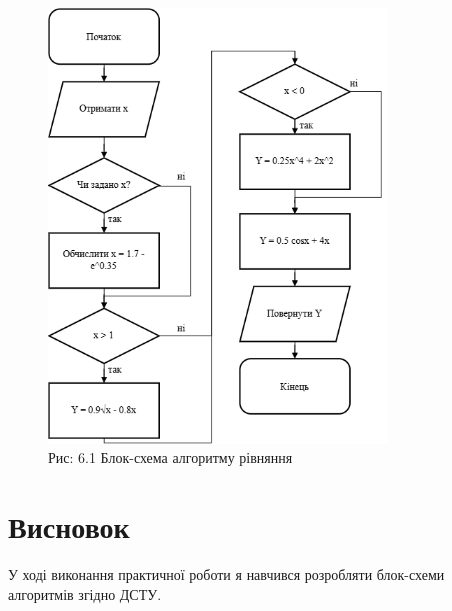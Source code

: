 \documentclass[a4paper]{article}
\begin{document}
\begin{figure}[h]
    \centering
    \includegraphics[width=0.8\textwidth]{imgs/PW6.png}
    \caption*{Рис: 6.1 Блок-схема алгоритму рівняння}
\end{figure}

\section*{Висновок}
У ході виконання практичної роботи я навчився  розробляти блок-схеми алгоритмів згідно ДСТУ.
\end{document}
